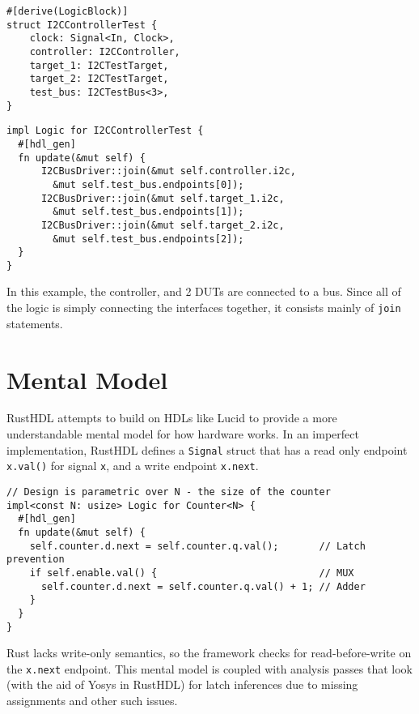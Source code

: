 \documentclass[sigplan,screen,sigconf]{acmart}
\begin{document}
\begin{minipage}{\linewidth*1/3}
\begin{verbatim}
#[derive(LogicBlock)]
struct I2CControllerTest {
    clock: Signal<In, Clock>,
    controller: I2CController,
    target_1: I2CTestTarget,
    target_2: I2CTestTarget,
    test_bus: I2CTestBus<3>,
}
\end{verbatim}
\end{minipage}
\begin{minipage}{\linewidth*2/3}
\begin{verbatim}
impl Logic for I2CControllerTest {
  #[hdl_gen]
  fn update(&mut self) {
      I2CBusDriver::join(&mut self.controller.i2c, 
        &mut self.test_bus.endpoints[0]);
      I2CBusDriver::join(&mut self.target_1.i2c,
        &mut self.test_bus.endpoints[1]);
      I2CBusDriver::join(&mut self.target_2.i2c, 
        &mut self.test_bus.endpoints[2]);
  }
}
\end{verbatim}
\end{minipage}

In this example, the controller, and 2 DUTs are connected to a bus.  Since all of the logic is simply
connecting the interfaces together, it consists mainly of \verb|join| statements. 

\section{Mental Model}
RustHDL attempts to build on HDLs like Lucid\cite{b11} to provide a more understandable mental model for how 
hardware works.  In an imperfect implementation, RustHDL defines a \verb|Signal| struct that has a 
read only endpoint \verb|x.val()| for signal \verb|x|, and a write endpoint \verb|x.next|.  

\begin{verbatim}
// Design is parametric over N - the size of the counter
impl<const N: usize> Logic for Counter<N> {
  #[hdl_gen]
  fn update(&mut self) {
    self.counter.d.next = self.counter.q.val();       // Latch prevention
    if self.enable.val() {                            // MUX
      self.counter.d.next = self.counter.q.val() + 1; // Adder
    }
  }
} 
\end{verbatim}

Rust lacks write-only semantics, so the framework checks for read-before-write on the \verb|x.next| 
endpoint.  This mental model is coupled with analysis passes that look (with the aid 
of Yosys\cite{b12} in RustHDL) for latch inferences due to missing assignments and other such issues.
\end{document}
